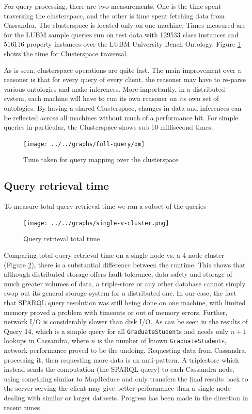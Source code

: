 \documentclass[journal]{IEEEtran}
\begin{document}
For query processing, there are two measurements. One is the time spent
traversing the clusterspace, and the other is time spent fetching data from
Cassandra. The clusterspace is located only on one machine. Times measured are
for the LUBM sample queries run on test data with 129533 class instances and
516116 property instances over the LUBM University Bench Ontology. Figure
\ref{fig:eval:qcs} shows the time for Clusterspace traversal.

As is seen, clusterspace operations are quite fast. The main improvement over
a reasoner is that for every query of every client, the reasoner may have to
re-parse various ontologies and make inferences. More importantly, in
a distributed system, each machine will have to run its own reasoner on its own
set of ontologies. By having a shared Clusterspace, changes in data and
inferences can be reflected across all machines without much of a performance
hit. For simple queries in particular, the Clusterspace shows sub 10
millisecond times.

\begin{figure}[h]
    \centering
    \texttt{[image: ../../graphs/full-query/qm]}
    \caption{Time taken for query mapping over the clusterspace}
    \label{fig:eval:qcs}
\end{figure}

\subsection{Query retrieval time}

To measure total query retrieval time we ran a subset of the queries

\begin{figure}[t]
    \centering
    \texttt{[image: ../../graphs/single-v-cluster.png]}
    \caption{Query retrieval total time}
    \label{fig:eval:qtotal}
\end{figure}

Comparing total query retrieval time on a single node vs. a 4 node cluster
(Figure \ref{fig:eval:qtotal}), there is a substantial difference between the
runtime. This shows that although distributed storage offers fault-tolerance,
data safety and storage of much greater volumes of data, a triple-store or any
other database cannot simply swap out its general storage system for
a distributed one. In our case, the fact that SPARQL query resolution was still
being done on one machine, with limited memory proved a problem with timeouts
or out of memory errors. Further, network I/O is considerably slower than disk
I/O. As can be seen in the results of Query 14, which is a simple query for all
\texttt{GraduateStudent}s and needs only $n+1$ lookups in Cassandra, where $n$
is the number of known \texttt{GraduateStudent}s, network performance proved to
be the undoing.  Requesting data from Cassandra, processing it, then requesting
more data is an anti-pattern. A triplestore which instead sends the computation
(the SPARQL query) to each Cassandra node, using something similar to MapReduce
and only transfers the final results back to the server serving the client may
give better performance than a single node dealing with similar or larger
datasets. Progress has been made in the direction in recent
times\cite{myung10spa}\cite{hus09hadoop}.
\end{document}
